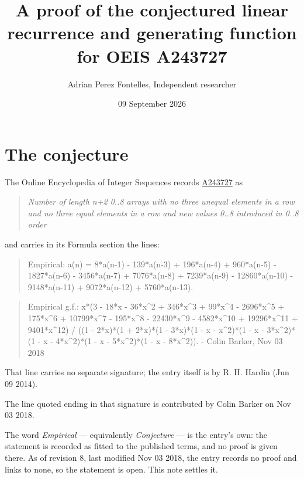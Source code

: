 \documentclass[11pt]{article}
\title{A proof of the conjectured linear recurrence and generating function for OEIS A243727}
\author{Adrian Perez Fontelles, Independent researcher}
\date{09 September 2026}
\theoremstyle{definition}
\begin{document}
\maketitle
\section{The conjecture}

The Online Encyclopedia of Integer Sequences records \href{https://oeis.org/A243727}{A243727} as

\begin{quote}\itshape Number of length n+2 0..8 arrays with no three unequal elements in a row and no three equal elements in a row and new values 0..8 introduced in 0..8 order\end{quote}

and carries in its Formula section the lines:

\begin{quote}\ttfamily Empirical: a(n) = 8*a(n-1) - 139*a(n-3) + 196*a(n-4) + 960*a(n-5) - 1827*a(n-6) - 3456*a(n-7) + 7076*a(n-8) + 7239*a(n-9) - 12860*a(n-10) - 9148*a(n-11) + 9072*a(n-12) + 5760*a(n-13).\end{quote}

\begin{quote}\ttfamily Empirical g.f.: x*(3 - 18*x - 36*x\textasciicircum{}2 + 346*x\textasciicircum{}3 + 99*x\textasciicircum{}4 - 2696*x\textasciicircum{}5 + 175*x\textasciicircum{}6 + 10799*x\textasciicircum{}7 - 195*x\textasciicircum{}8 - 22430*x\textasciicircum{}9 - 4582*x\textasciicircum{}10 + 19296*x\textasciicircum{}11 + 9401*x\textasciicircum{}12) / ((1 - 2*x)*(1 + 2*x)*(1 - 3*x)*(1 - x - x\textasciicircum{}2)*(1 - x - 3*x\textasciicircum{}2)*(1 - x - 4*x\textasciicircum{}2)*(1 - x - 5*x\textasciicircum{}2)*(1 - x - 8*x\textasciicircum{}2)). - Colin Barker, Nov 03 2018\end{quote}

That line carries no separate signature; the entry itself is by R. H. Hardin (Jun 09 2014).

The line quoted ending in that signature is contributed by Colin Barker on Nov 03 2018.

The word {\itshape Empirical} --- equivalently {\itshape Conjecture} --- is the entry's own: the statement is recorded as fitted to the published terms, and no proof is given there. As of revision 8, last modified Nov 03 2018, the entry records no proof and links to none, so the statement is open. This note settles it.
\end{document}
